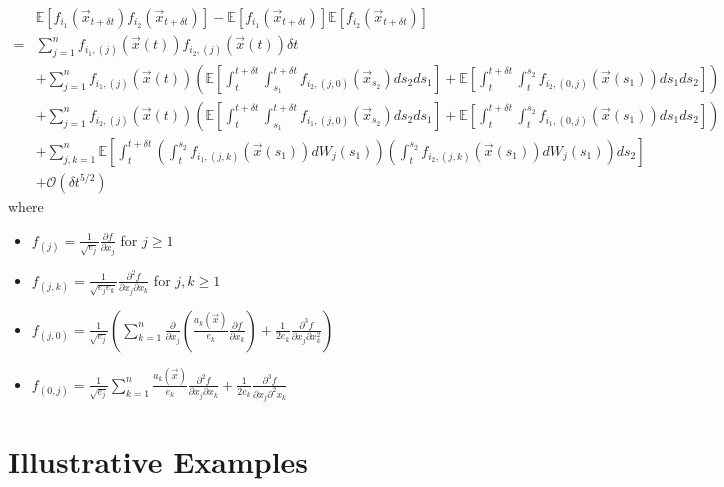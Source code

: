 \documentclass[12pt]{article}
\begin{document}
\begin{equation} \label{eq:cov_est}
\begin{aligned}
&\mathbb{E} \left[ f_{i_1}(\vec{x}_{t + \delta t}) f_{i_2}(\vec{x}_{t + \delta t}) \right] 
- \mathbb{E} \left[ f_{i_1}(\vec{x}_{t + \delta t}) \right] \mathbb{E} \left[ f_{i_2}(\vec{x}_{t + \delta t}) \right] \\
=& 
 \sum_{j=1}^n f_{{i_1},(j)}(\vec{x}(t)) f_{{i_2},(j)}(\vec{x}(t)) \delta t \\
&+ \sum_{j=1}^n f_{{i_1},(j)}(\vec{x}(t)) \left( \mathbb{E} \left[ \int_t^{t+\delta t} \int_{s_1}^{t+\delta t} f_{{i_2},(j,0)}(\vec{x}_{s_2}) ds_2 ds_1 \right] 
+ \mathbb{E} \left[  \int_t^{t+\delta t} \int_t^{s_2} f_{{i_2},(0,j)}(\vec{x}(s_1)) ds_1 ds_2\right] \right) \\
&+  \sum_{j=1}^n f_{{i_2},(j)}(\vec{x}(t)) \left( \mathbb{E} \left[ \int_t^{t+\delta t} \int_{s_1}^{t + \delta t} f_{{i_1},(j,0)}(\vec{x}_{s_2}) ds_2 ds_1 \right]
+ \mathbb{E} \left[ \int_t^{t+\delta t} \int_t^{s_2} f_{{i_1},(0,j)}(\vec{x}(s_1)) ds_1 ds_2 \right] \right) \\
&+ \sum_{j, k=1}^n \mathbb{E} \left[ \int_t^{t+\delta t}\left( \int_t^{s_2} f_{{i_1},(j,k)}(\vec{x}(s_1)) dW_j(s_1)  \right) \left(  \int_t^{s_2} f_{{i_2},(j,k)}(\vec{x}(s_1)) dW_j(s_1) \right) ds_2 \right] \\
&+ \mathcal{O} (\delta t^{5/2})
\end{aligned}
\end{equation}
%
where
\begin{itemize}
\item $f_{(j)} = \frac{1}{\sqrt{e_j}} \frac{\partial f}{\partial x_j}$ for $j \ge 1$
\item $f_{(j, k)} = \frac{1}{\sqrt{e_j e_k}} \frac{\partial^2 f}{\partial x_j \partial x_k}$ for $j,k \ge 1$
\item $f_{(j,0)} = \frac{1}{\sqrt{e_j}} \left( \sum_{k=1}^n \frac{\partial}{\partial x_j} \left( \frac{a_k(\vec{x})}{e_k} \frac{\partial f}{\partial x_k} \right) + \frac{1}{2 e_k} \frac{\partial^3 f}{\partial x_j \partial x_k^2} \right)$
\item $f_{(0, j)} = \frac{1}{\sqrt{e_j}} \sum_{k=1}^n \frac{a_k(\vec{x})}{e_k} \frac{\partial^2 f}{\partial x_j \partial x_k} +\frac{1}{2 e_k}  \frac{\partial^3 f}{\partial x_j \partial^2 x_k}$
\end{itemize}

\section{Illustrative Examples}
\end{document}
